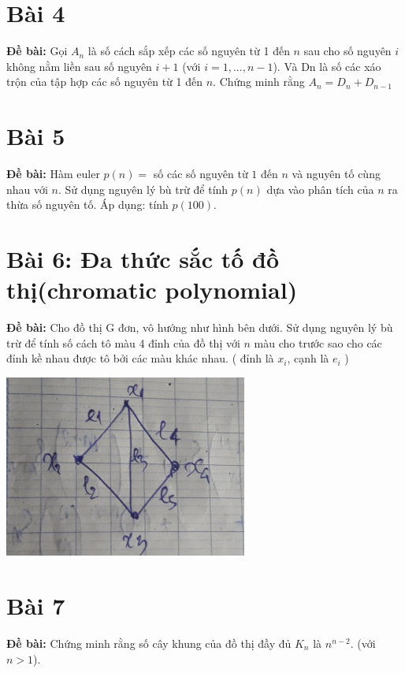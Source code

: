 \documentclass[12pt]{article}
\begin{document}
\begin{sloppypar}
\section{Bài 4}
\begin{tcolorbox}
    \textbf{Đề bài:}  Gọi \(A_{n}\) là số cách sắp xếp các số nguyên từ 1 đến \(n\) sau cho số nguyên \(i\) không nằm liền sau số nguyên \(i+1\) 
    (với \(i=1,...,n-1\)). Và Dn là số các xáo trộn của tập hợp các số nguyên từ 1 đến \(n\). Chứng minh rằng \(A_{n}= D_{n} + D_{n-1}\)
\end{tcolorbox}

\section{Bài 5}
\begin{tcolorbox}
    \textbf{Đề bài:} Hàm euler \(p(n)=\) số các số nguyên từ \(1\) đến \(n\) và nguyên tố cùng nhau với \(n\). Sử dụng nguyên lý bù trừ để tính \(p(n)\) dựa vào phân tích của \(n\) ra thừa số nguyên tố. Áp dụng: tính \(p(100)\).
\end{tcolorbox}

\section{Bài 6: Đa thức sắc tố đồ thị(chromatic polynomial)}
\begin{tcolorbox}
    \textbf{Đề bài:} Cho đồ thị G đơn, vô hướng như hình bên dưới.  Sử dụng nguyên lý bù trừ để tính số cách tô màu 4 đỉnh của đồ thị với  \(n\) màu cho trước sao cho các đỉnh kề nhau được tô bởi các màu khác nhau. ( đỉnh là \(x_{i}\), cạnh là \(e_{i}\) )
\end{tcolorbox}

\begin{center}
    {\includegraphics[width=8cm]{6.png}}
\end{center}

\section{Bài 7}
\begin{tcolorbox}
    \textbf{Đề bài:} Chứng minh rằng số cây khung của đồ thị đầy đủ \(K_{n}\) là \(n^{n-2}\).
    (với \(n > 1\)).
\end{tcolorbox}


\end{sloppypar}
\end{document}
